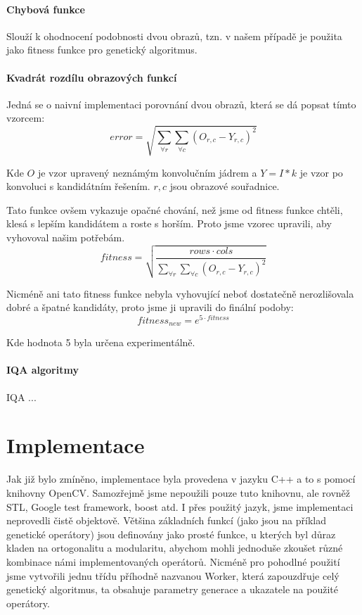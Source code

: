 \documentclass[a4paper,11pt]{scrartcl}
\begin{document}
\paragraph{Chybová funkce}

Slouží k ohodnocení podobnosti dvou obrazů, tzn. v našem případě je použita jako fitness funkce pro genetický algoritmus.

\paragraph{Kvadrát rozdílu obrazových funkcí}

Jedná se o naivní implementaci porovnání dvou obrazů, která se dá popsat tímto vzorcem:
\begin{equation}
  error = \sqrt{\sum\limits_{\forall r} \sum\limits_{\forall c} ( O_{r,c} - Y_{r,c} )^2}
\end{equation}

Kde $O$ je vzor upravený neznámým konvolučním jádrem a $Y = I \ast k $ je vzor po konvoluci s kandidátním řešením. $r,c$ jsou obrazové souřadnice.

Tato funkce ovšem vykazuje opačné chování, než jsme od fitness funkce chtěli, klesá s lepším kandidátem a roste s horším. Proto jsme vzorec upravili, aby vyhovoval našim potřebám.
\begin{equation}
  fitness = \sqrt{\frac{rows \cdot cols}{{\sum\limits_{\forall r} \sum\limits_{\forall c} ( O_{r,c} - Y_{r,c} )^2}}}
\end{equation}

Nicméně ani tato fitness funkce nebyla vyhovující neboť dostatečně nerozlišovala dobré a špatné kandidáty, proto jsme ji upravili do finální podoby:
\begin{equation}
  fitness_{new} = e ^ {5 \cdot fitness}
\end{equation}

Kde hodnota 5 byla určena experimentálně.

\paragraph{IQA algoritmy}

IQA ...

\section{Implementace}
Jak již bylo zmíněno, implementace byla provedena v jazyku C++ a to s pomocí knihovny OpenCV. Samozřejmě jsme nepoužili pouze tuto knihovnu, ale rovněž STL, Google test framework, boost atd. I přes použitý jazyk, jsme implementaci neprovedli čistě objektově. Většina základních funkcí (jako jsou na příklad genetické operátory) jsou definovány jako prosté funkce, u kterých byl důraz kladen na ortogonalitu a modularitu, abychom mohli jednoduše zkoušet různé kombinace námi implementovaných operátorů. Nicméně pro pohodlné použití jsme vytvořili jednu třídu příhodně nazvanou Worker, která zapouzdřuje celý genetický algoritmus, ta obsahuje parametry generace a ukazatele na použité operátory.
\end{document}

